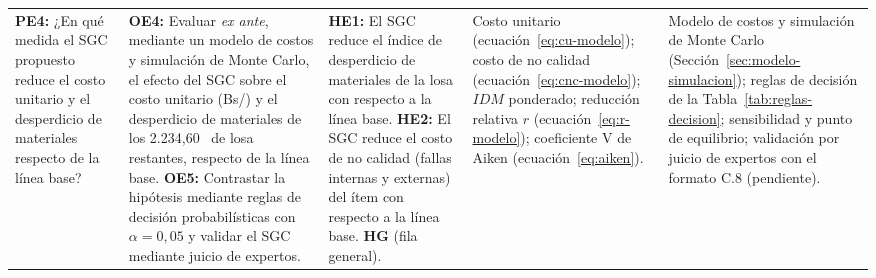 \begin{landscape}
\begin{longtable}{@{}P{4.4cm}P{4.4cm}P{4.6cm}P{4.0cm}P{4.3cm}@{}}
\midrule
\textbf{PE4:} ¿En qué medida el SGC propuesto reduce el costo unitario y el desperdicio de materiales respecto de la línea base?
& \textbf{OE4:} Evaluar \emph{ex ante}, mediante un modelo de costos y simulación de Monte Carlo, el efecto del SGC sobre el costo unitario (Bs/\mdos{}) y el desperdicio de materiales de los 2.234,60~\mdos{} de losa restantes, respecto de la línea base. \newline \textbf{OE5:} Contrastar la hipótesis mediante reglas de decisión probabilísticas con $\alpha = 0{,}05$ y validar el SGC mediante juicio de expertos.
& \textbf{HE1:} El SGC reduce el índice de desperdicio de materiales de la losa con respecto a la línea base. \newline \textbf{HE2:} El SGC reduce el costo de no calidad (fallas internas y externas) del ítem con respecto a la línea base. \newline \textbf{HG} (fila general).
& Costo unitario (ecuación~\eqref{eq:cu-modelo}); costo de no calidad (ecuación~\eqref{eq:cnc-modelo}); $IDM$ ponderado; reducción relativa $r$ (ecuación~\eqref{eq:r-modelo}); coeficiente V de Aiken (ecuación~\eqref{eq:aiken}).
& Modelo de costos y simulación de Monte Carlo (Sección~\ref{sec:modelo-simulacion}); reglas de decisión de la Tabla~\ref{tab:reglas-decision}; sensibilidad y punto de equilibrio; validación por juicio de expertos con el formato C.8 (pendiente). \\
\end{longtable}
\endgroup
{}


\end{landscape}

